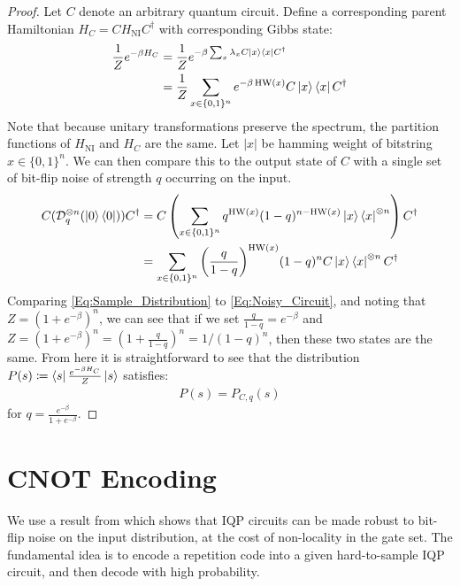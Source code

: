 \documentclass[a4paper,onecolumn,11pt,accepted=2017-05-09]{quantumarticle}
\newcommand{\HNI}{H_{\text{NI}}}
\newcommand{\ox}{\otimes}
\newcommand{\cD}{\mathcal{D}}
\DeclareMathOperator{\HW}{HW}
\begin{document}
	\begin{proof}
		Let $C$ denote an arbitrary quantum circuit.
		Define a corresponding parent Hamiltonian $H_C = C\HNI C^\dagger$ with corresponding Gibbs state:
		\begin{align}
			\frac{1}{Z}e^{-\beta H_C} &= \frac{1}{Z}e^{-\beta \sum_x \lambda_x C\ket{x}\bra{x}C^\dagger} \\
			&= \frac{1}{Z} \sum_{x\in \{0,1\}^n} e^{-\beta  \HW(x) }C\ket{x}\bra{x}C^\dagger \label{Eq:Sample_Distribution}
		\end{align} 
		Note that because unitary transformations preserve the spectrum, the partition functions of $\HNI$ and $H_C$ are the same. Let $|x|$ be hamming weight of bitstring $x \in \{0,1\}^n$.
        \noindent We can then compare this to the output state of $C$ with a single set of bit-flip noise of strength $q$ occurring on the input.
        \begin{align}
            C(\cD_q^{\ox n}(\ket{0}\bra{0}))C^\dagger &= C \left(\sum_{x \in \{0,1\}^n} q^{\HW(x)}(1-q)^{n-\HW(x)}\ket{x}\bra{x}^{\ox n} \right)C^\dagger  \\
            &= \sum_{x \in \{0,1\}^n} \bigg(\frac{q}{1-q}\bigg)^{\HW(x)}(1-q)^{n} C\ket{x}\bra{x}^{\ox n} C^\dagger \label{Eq:Noisy_Circuit}
        \end{align}
        Comparing \cref{Eq:Sample_Distribution} to \cref{Eq:Noisy_Circuit}, and noting that $Z = (1+e^{-\beta})^n$, we can see that if we set $\frac{q}{1-q} = e^{-\beta}$ and $Z = (1+e^{-\beta})^n = (1+\frac{q}{1-q})^n = 1/(1-q)^n$, then these two states are the same.
        From here it is straightforward to see that the distribution $ P(s) \coloneqq \bra{s}\frac{e^{-\beta H_C}}{Z}\ket{s}$ satisfies:
        \begin{align*}
            P(s) = P_{C, q }(s)  
        \end{align*}
        for  $q = \frac{e^{-\beta}}{1+e^{-\beta}}$.
	\end{proof}

	
	
\section{CNOT Encoding }\label{Appendix:CNOT_Encoding}

We use a result from \citeauthor{Bremner_2017} \cite{Bremner_2017} which shows that IQP circuits can be made robust to bit-flip noise on the input distribution, at the cost of non-locality in the gate set. 
The fundamental idea is to encode a repetition code into a given hard-to-sample IQP circuit, and then decode with high probability. 
\end{document}
